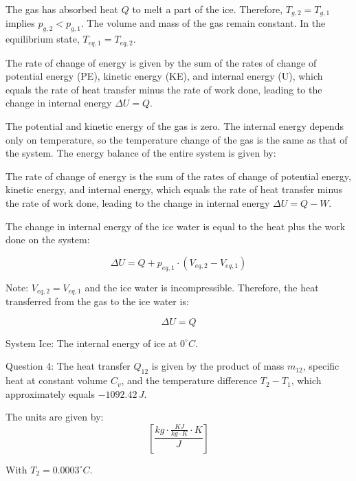 The gas has absorbed heat \( Q \) to melt a part of the ice. Therefore, \( T_{g,2} = T_{g,1} \) implies \( p_{g,2} < p_{g,1} \). The volume and mass of the gas remain constant. In the equilibrium state, \( T_{eq,1} = T_{eq,2} \).

The rate of change of energy is given by the sum of the rates of change of potential energy (PE), kinetic energy (KE), and internal energy (U), which equals the rate of heat transfer minus the rate of work done, leading to the change in internal energy \( \Delta U = Q \).

The potential and kinetic energy of the gas is zero. The internal energy depends only on temperature, so the temperature change of the gas is the same as that of the system. The energy balance of the entire system is given by:

The rate of change of energy is the sum of the rates of change of potential energy, kinetic energy, and internal energy, which equals the rate of heat transfer minus the rate of work done, leading to the change in internal energy \( \Delta U = Q - W \).

The change in internal energy of the ice water is equal to the heat plus the work done on the system:

\[
\Delta U = Q + p_{eq,1} \cdot (V_{eq,2} - V_{eq,1})
\]

Note: \( V_{eq,2} = V_{eq,1} \) and the ice water is incompressible. Therefore, the heat transferred from the gas to the ice water is:

\[
\Delta U = Q
\]

System Ice:
The internal energy of ice at \(0^\circ C\).

Question 4:
The heat transfer \( Q_{12} \) is given by the product of mass \( m_{12} \), specific heat at constant volume \( C_v \), and the temperature difference \( T_2 - T_1 \), which approximately equals \(-1092.42 \, J\).

The units are given by:
\[
\left[ \frac{kg \cdot \frac{KJ}{kg \cdot K} \cdot K}{J} \right]
\]

With \( T_2 = 0.0003^\circ C \).